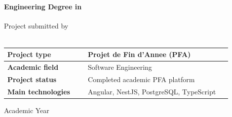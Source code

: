 \begin{center}
{\Large \textbf{\UNIVERSITY}}\\
{\large \UPMCentre}\\[18mm]

{\Large \textbf{Engineering Degree in \DoctoralProgramme}}\\[14mm]

{\Huge \textbf{\thesisTitle}}\\[16mm]

{\large Project submitted by}\\[4mm]
{\LARGE \textbf{\thesisAuthor}}\\[14mm]


\begin{tabular}{|p{0.32\linewidth}|p{0.58\linewidth}|}
\hline
\textbf{Project type} & Projet de Fin d'Annee (PFA) \\ \hline
\textbf{Academic field} & Software Engineering \\ \hline
\textbf{Project status} & Completed academic PFA platform \\ \hline
\textbf{Main technologies} & Angular, NestJS, PostgreSQL, TypeScript \\ \hline
\end{tabular}

\vfill
{\large Academic Year \thesisDate}
\end{center}
